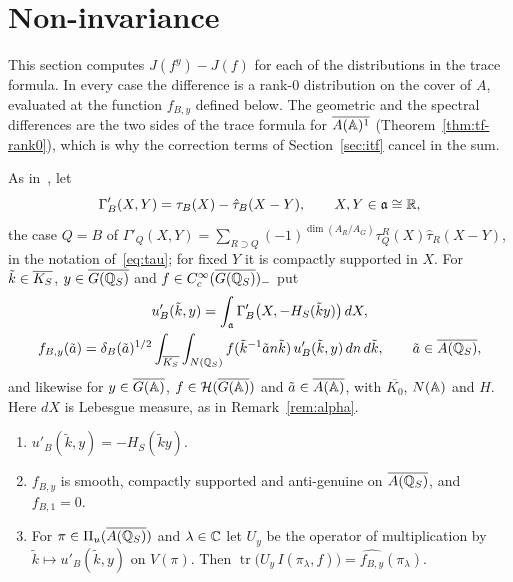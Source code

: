 \section{Non-invariance}\label{sec:noninv}

This section computes $J(f^y)-J(f)$ for each of the distributions in
the trace formula. In every case the difference is a rank-$0$
distribution on the cover of $A$, evaluated at the function $f_{B,y}$
defined below. The geometric and the spectral differences are the two
sides of the trace formula for $\overline{A(\mathbb{A})^1}$
(Theorem~\ref{thm:tf-rank0}), which is why the correction terms of
Section~\ref{sec:itf} cancel in the sum.

As in~\cite[\S\S2--3]{Ar81}, let
\begin{equation}\label{eq:Gammaprime}
\Gamma'_B(X,Y)=\tau_B(X)-\hat\tau_B(X-Y),\qquad X,Y\in\mathfrak a\cong\mathbb{R},
\end{equation}
the case $Q=B$ of $\Gamma'_Q(X,Y)=\sum_{R\supset Q}(-1)^{\dim(A_R/A_G)}
\tau_Q^R(X)\hat\tau_R(X-Y)$, in the notation of~\eqref{eq:tau}; for fixed
$Y$ it is compactly supported in $X$. For $\tilde k\in\overline{K_S}$, $y\in\overline{G(\mathbb{Q}_S)}$ and
$f\in C_c^\infty(\overline{G(\mathbb{Q}_S)})_-$ put
\begin{gather}
u'_B(\tilde k,y)=\int_{\mathfrak a}\Gamma'_B\bigl(X,-H_S(\tilde ky)\bigr)
\,dX,\label{eq:uprime}\\
f_{B,y}(\tilde a)=\delta_B(\tilde a)^{1/2}\int_{\overline{K_S}}\int_{N(\mathbb{Q}_S)}
f(\tilde k^{-1}\tilde an\tilde k)\,u'_B(\tilde k,y)\,dn\,d\tilde k,\qquad
\tilde a\in\overline{A(\mathbb{Q}_S)},\label{eq:fBy}
\end{gather}
and likewise for $y\in\overline{G(\mathbb{A})}$, $f\in\mathcal H(\overline{G(\mathbb{A})})$ and $\tilde a\in
\overline{A(\mathbb{A})}$, with $\overline{K_0}$, $N(\mathbb{A})$ and $H$. Here $dX$ is
Lebesgue measure, as in Remark~\ref{rem:alpha}.

\begin{lemma}\label{lem:uprime}
\begin{enumerate}[label=(\alph*)]
\item $u'_B(\tilde k,y)=-H_S(\tilde ky)$.
\item $f_{B,y}$ is smooth, compactly supported and anti-genuine on $\overline{A(\mathbb{Q}_S)}$,
  and $f_{B,1}=0$.
\item For $\pi\in\Pi_u(\overline{A(\mathbb{Q}_S)})$ and $\lambda\in\mathbb{C}$ let $U_y$ be the operator
  of multiplication by $\tilde k\mapsto u'_B(\tilde k,y)$ on $V(\pi)$.
  Then $\operatorname{tr}\bigl(U_y\,I(\pi_\lambda,f)\bigr)
  =\widehat{f_{B,y}}(\pi_\lambda)$.
\end{enumerate}
\end{lemma}

